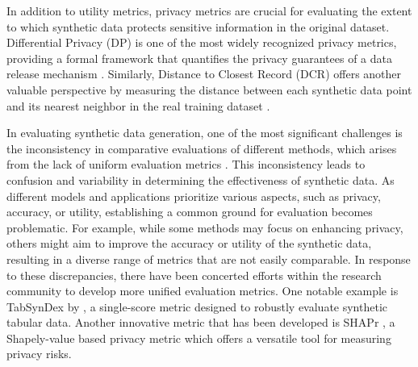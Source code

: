 \documentclass{article}
\begin{document}
In addition to utility metrics, privacy metrics are crucial for evaluating the extent to which synthetic data protects sensitive information in the original dataset. Differential Privacy (DP) is one of the most widely recognized privacy metrics, providing a formal framework that quantifies the privacy guarantees of a data release mechanism \parencite{jordon_synthetic_2022,goyal_systematic_2024,kaabachi_scoping_2024,nikolenko_synthetic_2019}. Similarly, Distance to Closest Record (DCR) offers another valuable perspective by measuring the distance between each synthetic data point and its nearest neighbor in the real training dataset \parencite{mendelevitch_fidelity_2021}.

In evaluating synthetic data generation, one of the most significant challenges is the inconsistency in comparative evaluations of different methods, which arises from the lack of uniform evaluation metrics \parencite{chundawat_tabsyndex_2024}. This inconsistency leads to confusion and variability in determining the effectiveness of synthetic data. As different models and applications prioritize various aspects, such as privacy, accuracy, or utility, establishing a common ground for evaluation becomes problematic. For example, while some methods may focus on enhancing privacy, others might aim to improve the accuracy or utility of the synthetic data, resulting in a diverse range of metrics that are not easily comparable. In response to these discrepancies, there have been concerted efforts within the research community to develop more unified evaluation metrics. One notable example is TabSynDex by \cite{chundawat_tabsyndex_2024}, a single-score metric designed to robustly evaluate synthetic tabular data. Another innovative metric that has been developed is SHAPr \parencite{duddu_shapr_2022}, a Shapely-value based privacy metric which offers a versatile tool for measuring privacy risks.
\end{document}
